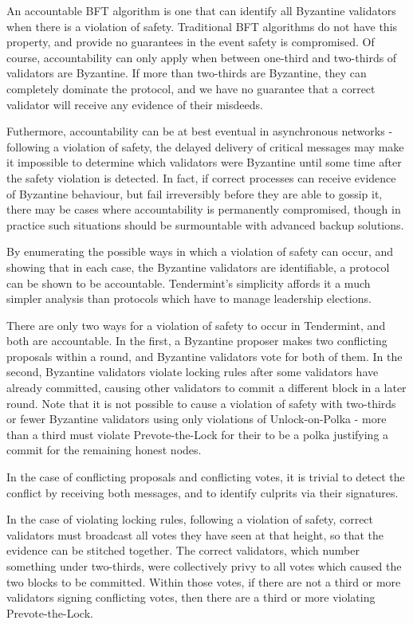An accountable BFT algorithm is one that can identify all Byzantine validators 
when there is a violation of safety. 
Traditional BFT algorithms do not have this property,
and provide no guarantees in the event safety is compromised.
Of course, accountability can only apply when between one-third and two-thirds of
validators are Byzantine.
If more than two-thirds are Byzantine, they can completely dominate the protocol,
and we have no guarantee that a correct validator will receive any evidence of their misdeeds.

Futhermore, accountability can be at best eventual in asynchronous networks - 
following a violation of safety, the delayed delivery of critical messages
may make it impossible to determine which validators were Byzantine until some time after
the safety violation is detected. 
In fact, if correct processes can receive evidence of Byzantine behaviour, 
but fail irreversibly before they are able to gossip it, 
there may be cases where accountability is permanently compromised,
though in practice such situations should be surmountable
with advanced backup solutions.

By enumerating the possible ways in which a violation of safety can occur,
and showing that in each case, the Byzantine validators are identifiable,
a protocol can be shown to be accountable.
Tendermint's simplicity affords it a much simpler analysis than protocols 
which have to manage leadership elections.

There are only two ways for a violation of safety to occur in Tendermint,
and both are accountable.
In the first, a Byzantine proposer makes two conflicting proposals within a round,
and Byzantine validators vote for both of them.
In the second, Byzantine validators violate locking rules after some validators have already committed,
causing other validators to commit a different block in a later round.
Note that it is not possible to cause a violation of safety with two-thirds or fewer
Byzantine validators using only violations of Unlock-on-Polka - 
more than a third must violate Prevote-the-Lock for their to be a polka justifying a commit 
for the remaining honest nodes.

In the case of conflicting proposals and conflicting votes,
it is trivial to detect the conflict by receiving both messages,
and to identify culprits via their signatures.

In the case of violating locking rules, following a violation of safety,
correct validators must broadcast all votes they have seen at that height, 
so that the evidence can be stitched together.
The correct validators, which number something under two-thirds, 
were collectively privy to all votes which caused the two blocks to be committed.
Within those votes, if there are not a third or more validators signing conflicting votes,
then there are a third or more violating Prevote-the-Lock.

